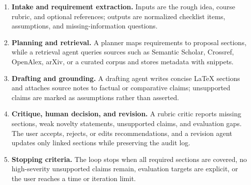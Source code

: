 \documentclass[11pt]{article}
\begin{document}
\begin{enumerate}
\item \textbf{Intake and requirement extraction.} Inputs are the rough idea, course rubric, and optional references; outputs are normalized checklist items, assumptions, and missing-information questions.
\item \textbf{Planning and retrieval.} A planner maps requirements to proposal sections, while a retrieval agent queries sources such as Semantic Scholar, Crossref, OpenAlex, arXiv, or a curated corpus and stores metadata with snippets.
\item \textbf{Drafting and grounding.} A drafting agent writes concise LaTeX sections and attaches source notes to factual or comparative claims; unsupported claims are marked as assumptions rather than asserted.
\item \textbf{Critique, human decision, and revision.} A rubric critic reports missing sections, weak novelty statements, unsupported claims, and evaluation gaps. The user accepts, rejects, or edits recommendations, and a revision agent updates only linked sections while preserving the audit log.
\item \textbf{Stopping criteria.} The loop stops when all required sections are covered, no high-severity unsupported claims remain, evaluation targets are explicit, or the user reaches a time or iteration limit.
\end{enumerate}
\end{document}
